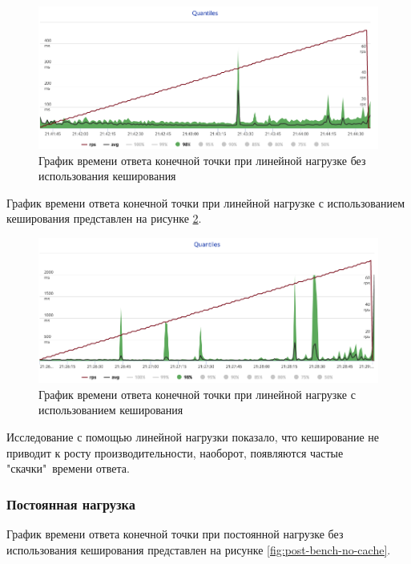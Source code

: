 \begin{figure}[hbtp]
	\centering
	\includegraphics[width=\textwidth]{img/bench-lin-no-cache}
	\caption{График времени ответа конечной точки при линейной нагрузке без использования кеширования}
	\label{fig:lin-bench-no-cache}
\end{figure}

\newpage

График  времени ответа конечной точки при линейной
нагрузке с использованием кеширования представлен на рисунке \ref{fig:lin-bench-cache}.

\begin{figure}[hbtp]
	\centering
	\includegraphics[width=\textwidth]{img/bench-lin-cache}
	\caption{График времени ответа конечной точки при линейной нагрузке с использованием кеширования}
	\label{fig:lin-bench-cache}
\end{figure}

Исследование с помощью линейной нагрузки показало, что кеширование не приводит к росту производительности, наоборот, появляются частые "скачки"\ времени ответа.


\subsubsection*{Постоянная нагрузка}

График  времени ответа конечной точки при постоянной
нагрузке без использования кеширования представлен на рисунке \ref{fig:post-bench-no-cache}.

